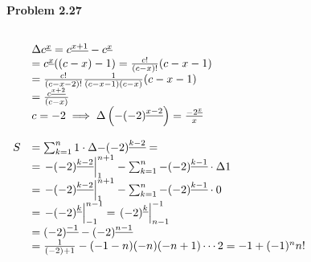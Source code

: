\documentclass[a4paper,10pt,fleqn]{article}
\begin{document}
\newcommand{\ffac}[1]{%
  x^{\underline{#1}}%
}
\newcommand{\ffact}[2]{%
  {#1}^{\underline{#2}}%
}
\everymath{\displaystyle}

\textbf{Problem 2.27}

$
\begin{array}{ll}\\
  & \Delta \ffact{c}{x} = \ffact{c}{x+1} - \ffact{c}{x}\\
& = \ffact{c}{x} ((c-x)-1) = \frac{c!}{(c-x)!} (c-x-1)\\
& = \frac{c!}{(c-x-2)!} \frac{1}{(c-x-1)(c-x)} (c-x-1)\\
& = \frac{\ffact{c}{x+2}}{(c-x)}
\\
& c=-2 \implies \Delta \left( -\ffact{(-2)}{x-2} \right) = \frac{\ffact{-2}{x}}{x} \\
\\
S & = \sum_{k=1}^n 1 \cdot \Delta \ffact{-(-2)}{k-2} = \\
  & = \left. \ffact{-(-2)}{k-2} \right|_{1}^{n+1} - \sum_{k=1}^n \ffact{-(-2)}{k-1} \cdot \Delta 1 \\
  & = \left. \ffact{-(-2)}{k-2} \right|_{1}^{n+1} - \sum_{k=1}^n \ffact{-(-2)}{k-1} \cdot 0 \\  
  & = \left. \ffact{-(-2)}{k} \right|_{-1}^{n-1} = \left. \ffact{(-2)}{k} \right|_{n-1}^{-1} \\
  & = \ffact{(-2)}{-1} - \ffact{(-2)}{n-1} \\
  & = \frac{1}{(-2)+1} - (-1-n)(-n)(-n+1)\cdots 2 = -1+(-1)^n n!\\
\end{array}
$
\end{document}
